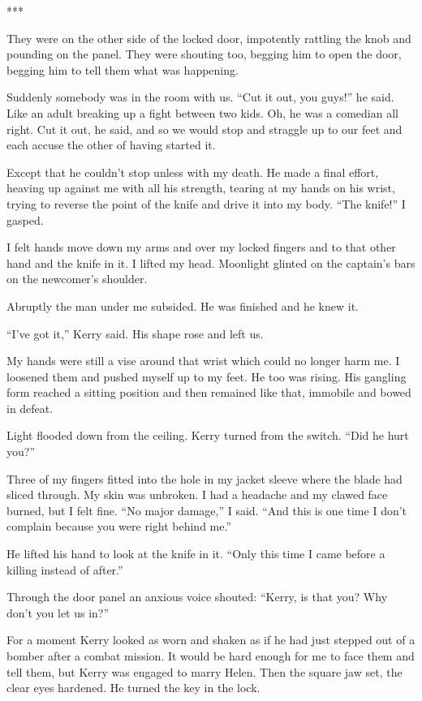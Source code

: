 \documentclass{novel}
\begin{document}
{***

They were on the other side of the locked door, impotently rattling the knob and pounding on the panel. They were shouting too, begging him to open the door, begging him to tell them what was happening.

Suddenly somebody was in the room with us. “Cut it out, you guys!” he said. Like an adult breaking up a fight between two kids. Oh, he was a comedian all right. Cut it out, he said, and so we would stop and straggle up to our feet and each accuse the other of having started it.

Except that he couldn’t stop unless with my death. He made a final effort, heaving up against me with all his strength, tearing at my hands on his wrist, trying to reverse the point of the knife and drive it into my body. “The knife!” I gasped.

I felt hands move down my arms and over my locked fingers and to that other hand and the knife in it. I lifted my head. Moonlight glinted on the captain’s bars on the newcomer’s shoulder.

Abruptly the man under me subsided. He was finished and he knew it.

“I’ve got it,” Kerry said. His shape rose and left us.

My hands were still a vise around that wrist which could no longer harm me. I loosened them and pushed myself up to my feet. He too was rising. His gangling form reached a sitting position and then remained like that, immobile and bowed in defeat.

Light flooded down from the ceiling. Kerry turned from the switch. “Did he hurt you?”

Three of my fingers fitted into the hole in my jacket sleeve where the blade had sliced through. My skin was unbroken. I had a headache and my clawed face burned, but I felt fine. “No major damage,” I said. “And this is one time I don’t complain because you were right behind me.”

He lifted his hand to look at the knife in it. “Only this time I came before a killing instead of after.”

Through the door panel an anxious voice shouted: “Kerry, is that you? Why don’t you let us in?”

For a moment Kerry looked as worn and shaken as if he had just stepped out of a bomber after a combat mission. It would be hard enough for me to face them and tell them, but Kerry was engaged to marry Helen. Then the square jaw set, the clear eyes hardened. He turned the key in the lock.

}
\end{document}
